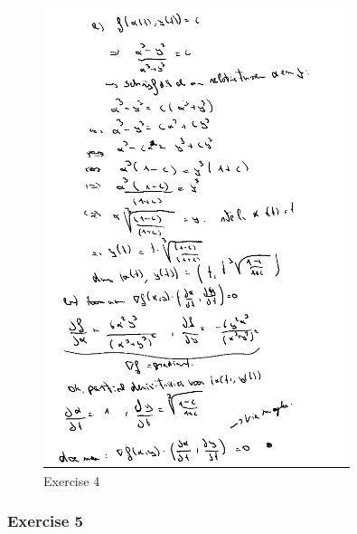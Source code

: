 \documentclass[a4paper]{report}
\begin{document}
\begin{figure}[H]
	\centering
	\includegraphics[width=0.8\textwidth]{assets/huis_4_ex_4.png}
	\caption{Exercise 4}
	\label{fig:huis_4_ex_4}
\end{figure}

\subsubsection{Exercise 5}
\end{document}
